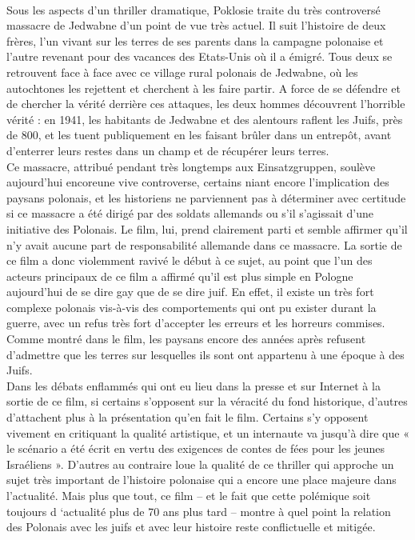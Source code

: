 \documentclass[12pt]{amsart}
\begin{document}
\paragraph{}
Sous les aspects d’un thriller dramatique, Poklosie traite du très controversé massacre de Jedwabne d’un point de vue très actuel. Il suit l’histoire de deux frères, l’un vivant sur les terres de ses parents dans la campagne polonaise et l’autre revenant pour des vacances des Etats-Unis où il a émigré. Tous deux se retrouvent face à face avec ce village rural polonais de Jedwabne, où les autochtones les rejettent et cherchent à les faire partir. A force de se défendre et de chercher la vérité derrière ces attaques, les deux hommes découvrent l’horrible vérité : en 1941, les habitants de Jedwabne et des alentours raflent les Juifs, près de 800, et les tuent publiquement en les faisant brûler dans un entrepôt, avant d’enterrer leurs restes dans un champ et de récupérer leurs terres. \\
Ce massacre, attribué pendant très longtemps aux  Einsatzgruppen, soulève aujourd’hui encoreune vive controverse, certains niant encore l’implication des paysans polonais, et les historiens ne parviennent pas à déterminer avec certitude si ce massacre a été dirigé par des soldats allemands ou s’il s’agissait d’une initiative des Polonais. Le film, lui, prend clairement parti et semble affirmer qu’il n’y avait aucune part de responsabilité allemande dans ce massacre. La sortie de ce film a donc violemment ravivé le début à ce sujet, au point que l’un des acteurs principaux de ce film a affirmé qu’il est plus simple en Pologne aujourd’hui de se dire gay que de se dire juif. En effet, il existe un très fort complexe polonais vis-à-vis des comportements qui ont pu exister durant la guerre, avec un refus très fort d’accepter les erreurs et les horreurs commises. Comme montré dans le film, les paysans encore des années après refusent d’admettre que les terres sur lesquelles ils sont ont appartenu à une époque à des Juifs. 
\\
Dans les débats enflammés qui ont eu lieu dans la presse et sur Internet à la sortie de ce film, si certains s’opposent sur la véracité du fond historique, d’autres d’attachent plus à la présentation qu’en fait le film. Certains s’y opposent vivement en critiquant la qualité artistique, et un internaute va jusqu’à dire que « le scénario a été écrit en vertu des exigences de contes de fées pour les jeunes Israéliens ». D’autres au contraire loue la qualité de ce thriller qui approche un sujet très important de l’histoire polonaise qui a encore une place majeure dans l’actualité. Mais plus que tout, ce film – et le fait que cette polémique soit toujours d ‘actualité plus de 70 ans plus tard – montre à quel point la relation des Polonais avec les juifs et avec leur histoire reste conflictuelle et mitigée. 
\end{document}

